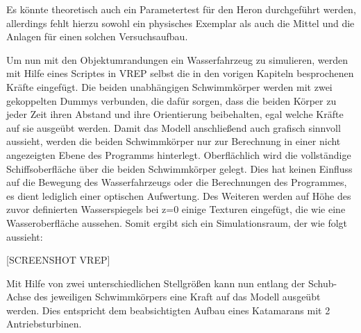 Es könnte theoretisch auch ein Parametertest für den Heron durchgeführt werden, allerdings fehlt hierzu sowohl ein physisches Exemplar als auch die Mittel und die Anlagen für einen solchen Versuchsaufbau.

Um nun mit den Objektumrandungen ein Wasserfahrzeug zu simulieren, werden mit Hilfe eines Scriptes in VREP selbst die in den vorigen Kapiteln besprochenen Kräfte eingefügt.
Die beiden unabhängigen Schwimmkörper werden mit zwei gekoppelten Dummys verbunden, die dafür sorgen, dass die beiden Körper zu jeder Zeit ihren Abstand und ihre Orientierung beibehalten, egal welche Kräfte auf sie ausgeübt werden.
Damit das Modell anschließend auch grafisch sinnvoll aussieht, werden die beiden Schwimmkörper nur zur Berechnung in einer nicht angezeigten Ebene des Programms hinterlegt. Oberflächlich wird die vollständige Schiffsoberfläche über die beiden Schwimmkörper gelegt. Dies hat keinen Einfluss auf die Bewegung des Wasserfahrzeugs oder die Berechnungen des Programmes, es dient lediglich einer optischen Aufwertung.
Des Weiteren werden auf Höhe des zuvor definierten Wasserspiegels bei z=0 einige Texturen eingefügt, die wie eine Wasseroberfläche aussehen. 
Somit ergibt sich ein Simulationsraum, der wie folgt aussieht:

[SCREENSHOT VREP] 

Mit Hilfe von zwei unterschiedlichen Stellgrößen kann nun entlang der Schub-Achse des jeweiligen Schwimmkörpers eine Kraft auf das Modell ausgeübt werden. Dies entspricht dem beabsichtigten Aufbau eines Katamarans mit 2 Antriebsturbinen.

